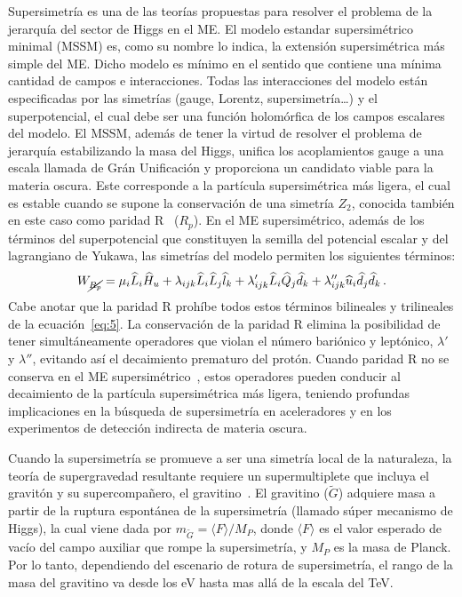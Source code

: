 Supersimetría \cite{Martin:1997ns,Haber:1984rc} es una de las teorías
propuestas para resolver el problema de la jerarquía del sector de Higgs
en el ME. El modelo estandar supersimétrico minimal (MSSM) es, como su
nombre lo indica, la extensión supersimétrica más simple del ME.
Dicho modelo es mínimo en el sentido que contiene una mínima cantidad de campos
e interacciones.
Todas las interacciones del modelo están especificadas por las simetrías
(gauge, Lorentz, supersimetría\dots) y el superpotencial,
el cual debe ser una función holomórfica de los campos escalares del
modelo. El MSSM, además de tener la virtud de resolver el problema de jerarquía
estabilizando la masa del Higgs, unifica los acoplamientos gauge a una escala
llamada de Grán Unificación y proporciona un candidato viable para la materia
oscura. Este corresponde a la partícula supersimétrica más ligera, el
cual es estable cuando se supone la conservación de una simetría $Z_2$,
conocida también en este caso como paridad R~\cite{Ellis:1983ew} ($R_p$).
En el ME supersimétrico, además de los términos
del superpotencial que constituyen la semilla del potencial escalar y
del lagrangiano de Yukawa, las simetrías del modelo permiten los siguientes
términos:
\begin{equation}
  \label{eq:5}
  W_{\cancel{R_p}} = \mu_i\widehat{L}_i\widehat{H}_u + 
  \lambda_{i j k}\widehat{L}_i\widehat{L}_j\widehat{l}_k +
  \lambda'_{i j k}\widehat{L}_i\widehat{Q}_j\widehat{d}_k + 
  \lambda''_{ijk}\widehat{u}_i\widehat{d}_j\widehat{d}_k\,.
\end{equation}
Cabe anotar que la paridad R prohíbe todos estos términos bilineales
y trilineales de la ecuación~\eqref{eq:5}. La conservación de la paridad R
elimina la posibilidad de tener simultáneamente operadores que violan el
número bariónico y leptónico, $\lambda'$ y $\lambda''$, evitando así
el decaimiento prematuro del protón. Cuando paridad R no se conserva
en el ME supersimétrico~\cite{Barbier:2004ez}, estos
operadores pueden conducir al decaimiento de la partícula
supersimétrica más ligera, teniendo profundas implicaciones en la
búsqueda de supersimetría en aceleradores y en los experimentos de
detección indirecta de materia oscura. 

Cuando la supersimetría se promueve a ser una simetría local de la
naturaleza, la teoría de supergravedad resultante requiere un
supermultiplete que incluya el gravitón y su supercompañero, el
gravitino~\cite{Martin:1997ns,Nilles:1983ge}. El gravitino ($\tilde
G$) adquiere masa a partir de la ruptura espontánea de la
supersimetría (llamado súper mecanismo de Higgs), la cual viene dada
por $m_{\tilde G}=\langle F\rangle/M_P$, donde $\langle F\rangle$ es el valor esperado de vacío
del campo auxiliar que rompe la supersimetría, y $M_P$ es la masa de
Planck. Por lo tanto, dependiendo del escenario de rotura de
supersimetría, el rango de la masa del gravitino va desde los eV hasta
mas allá de la escala del TeV.

